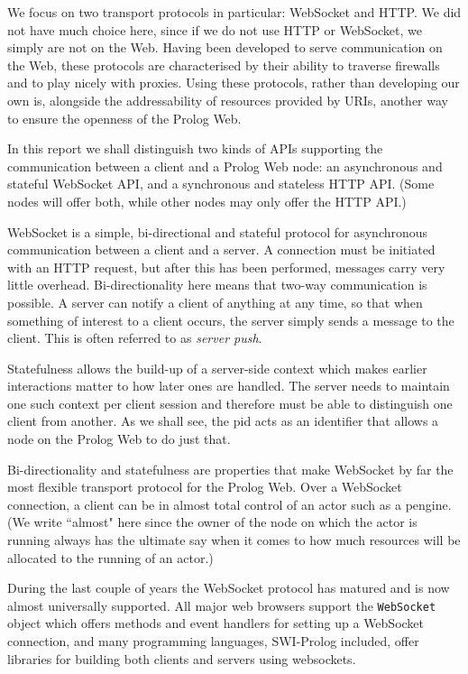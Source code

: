 \documentclass{tlp}
\begin{document}
We focus on two transport protocols in particular: WebSocket and HTTP. We did not have much choice here, since if we do not use HTTP or WebSocket, we simply are not on the Web. Having been developed to serve communication on the Web, these protocols are characterised by their ability to traverse firewalls and to play nicely with proxies. Using these protocols, rather than developing our own is, alongside the addressability of resources provided by URIs, another way to ensure the openness of the Prolog Web.

In this report we shall distinguish two kinds of APIs supporting the communication between a client and a Prolog Web node: an asynchronous and stateful WebSocket API, and a synchronous and stateless HTTP API. (Some nodes will offer both, while other nodes may only offer the HTTP API.)

WebSocket is a simple, bi-directional and stateful protocol for asynchronous communication between a client and a server. A connection must be initiated with an HTTP request, but after this has been performed, messages carry very little overhead. Bi-directionality here means that two-way communication is possible. A server can notify a client of anything at any time, so that when something of interest to a client occurs, the server simply sends a message to the client. This is often referred to as \textit{server push}. 

Statefulness allows the build-up of a server-side context which makes earlier interactions matter to how later ones are handled. The server needs to maintain one such context per client session and therefore must be able to distinguish one client from another. As we shall see, the pid acts as an identifier that allows a node on the Prolog Web to do just that.

Bi-directionality and statefulness are properties that make WebSocket by far the most flexible transport protocol for the Prolog Web. Over a WebSocket connection, a client can be in almost total control of an actor such as a pengine. (We write ``almost" here since the owner of the node on which the actor is running always has the ultimate say when it comes to how much resources will be allocated to the running of an actor.) 

During the last couple of years the WebSocket protocol has matured and is now almost universally supported. All major web browsers support the \texttt{WebSocket} object which offers methods and event handlers for setting up a WebSocket connection, and many programming languages, SWI-Prolog included, offer libraries for building both clients and servers using websockets. 
\end{document}
